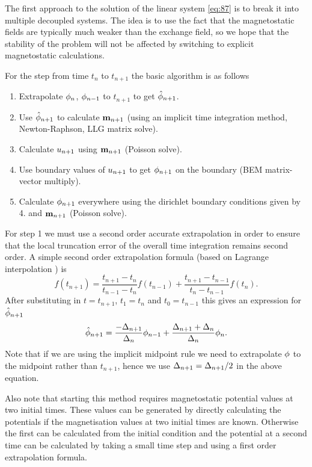 The first approach to the solution of the linear system \cref{eq:87} is to break it into multiple decoupled systems.
The idea is to use the fact that the magnetostatic fields are typically much weaker than the exchange field, so we hope that the stability of the problem will not be affected by switching to explicit magnetostatic calculations.


For the step from time $t_n$ to $t_{n+1}$ the basic algorithm is as follows
\begin{enumerate}
\item Extrapolate $\phi_n$, $\phi_{n-1}$ to $t_{n+1}$ to get $\hat{\phi}_{n+1}$.
\item Use $\hat{\phi}_{n+1}$ to calculate $\boldsymbol{\mathrm{m}}_{n+1}$ (using an implicit time integration method, Newton-Raphson, LLG matrix solve).
\item Calculate $u_{n+1}$ using $\boldsymbol{\mathrm{m}}_{n+1}$ (Poisson solve).
\item Use boundary values of $u_{n+1}$ to get $\phi_{n+1}$ on the boundary (BEM matrix-vector multiply).
\item Calculate $\phi_{n+1}$ everywhere using the dirichlet boundary conditions given by 4. and $\boldsymbol{\mathrm{m}}_{n+1}$ (Poisson solve).
\end{enumerate}

For step 1 we must use a second order accurate extrapolation in order to ensure that the local truncation error of the overall time integration remains second order.
A simple second order extrapolation formula (based on Lagrange interpolation \cite[312]{Kincaid2002}) is
\begin{equation}
  \label{eq:65}
  f(t_{n+1}) = \frac{t_{n+1} - t_n}{t_{n-1} - t_n}f(t_{n-1}) + \frac{t_{n+1} - t_{n-1}}{t_n - t_{n-1}}f(t_n).
\end{equation}
After substituting in $t=t_{n+1}$, $t_1=t_n$ and $t_0=t_{n-1}$ this gives an expression for $\hat{\phi}_{n+1}$
\begin{equation}
  \label{eq:66}
  \hat{\phi}_{n+1} = \frac{-\Delta_{n+1}}{\Delta_{n}} \phi_{n-1} + \frac{\Delta_{n+1} + \Delta_{n}}{\Delta_{n}} \phi_n.
\end{equation}
Note that if we are using the implicit midpoint rule we need to extrapolate $\phi$ to the midpoint rather than $t_{n+1}$, hence we use $\Delta_{n+1} = \Delta_{n+1} /2$ in the above equation.

Also note that starting this method requires magnetostatic potential values at two initial times.
These values can be generated by directly calculating the potentials if the magnetisation values at two initial times are known.
Otherwise the first can be calculated from the initial condition and the potential at a second time can be calculated by taking a small time step and using a first order extrapolation formula.


